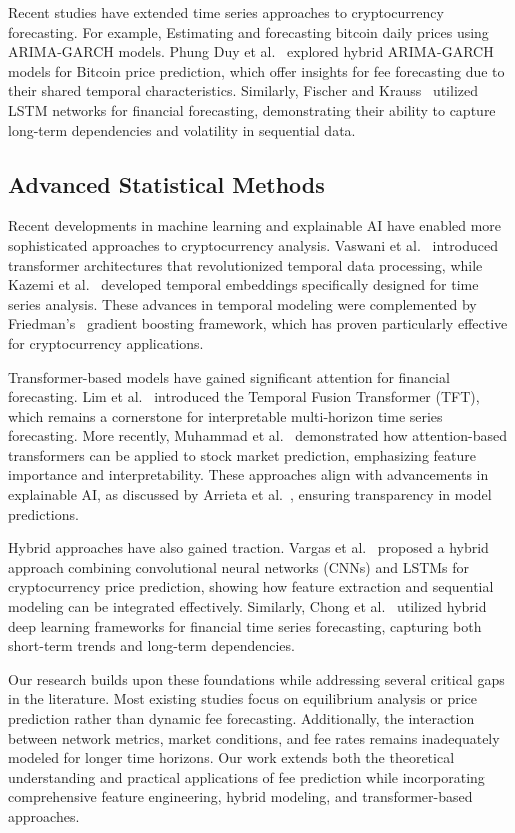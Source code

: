 Recent studies have extended time series approaches to cryptocurrency forecasting. For example, 
Estimating and forecasting bitcoin daily prices using ARIMA-GARCH models.
Phung Duy et al.~\cite{kamalov2021forecasting} explored hybrid ARIMA-GARCH models for Bitcoin price prediction, which offer insights for fee forecasting due to their shared temporal characteristics. Similarly, Fischer and Krauss~\cite{fischer2018deep} utilized LSTM networks for financial forecasting, demonstrating their ability to capture long-term dependencies and volatility in sequential data.

\subsection{Advanced Statistical Methods}
Recent developments in machine learning and explainable AI have enabled more sophisticated approaches to cryptocurrency analysis. Vaswani et al.~\cite{vaswani2017attention} introduced transformer architectures that revolutionized temporal data processing, while Kazemi et al.~\cite{kazemi2019time2vec} developed temporal embeddings specifically designed for time series analysis. These advances in temporal modeling were complemented by Friedman's~\cite{friedman2001greedy} gradient boosting framework, which has proven particularly effective for cryptocurrency applications.

Transformer-based models have gained significant attention for financial forecasting. Lim et al.~\cite{lim2021temporal} introduced the Temporal Fusion Transformer (TFT), which remains a cornerstone for interpretable multi-horizon time series forecasting. More recently, Muhammad et al.~\cite{muhammad2023transformer} demonstrated how attention-based transformers can be applied to stock market prediction, emphasizing feature importance and interpretability. These approaches align with advancements in explainable AI, as discussed by Arrieta et al.~\cite{arrieta2020explainable}, ensuring transparency in model predictions.

Hybrid approaches have also gained traction. Vargas et al.~\cite{vargas2018hybrid} proposed a hybrid approach combining convolutional neural networks (CNNs) and LSTMs for cryptocurrency price prediction, showing how feature extraction and sequential modeling can be integrated effectively. Similarly, Chong et al.~\cite{chong2017deep} utilized hybrid deep learning frameworks for financial time series forecasting, capturing both short-term trends and long-term dependencies.

Our research builds upon these foundations while addressing several critical gaps in the literature. Most existing studies focus on equilibrium analysis or price prediction rather than dynamic fee forecasting. Additionally, the interaction between network metrics, market conditions, and fee rates remains inadequately modeled for longer time horizons. Our work extends both the theoretical understanding and practical applications of fee prediction while incorporating comprehensive feature engineering, hybrid modeling, and transformer-based approaches.